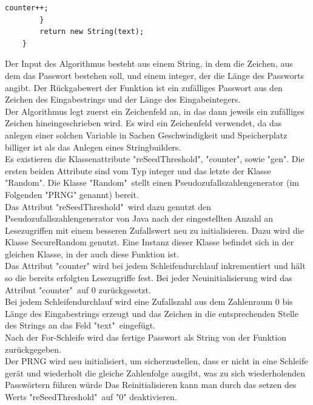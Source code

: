 \documentclass[11pt]{article}
\begin{document}
\begin{samepage}
\begin{lstlisting}[caption=Algorithmus zur Passwortgenerierung, label=lst:makePassword_1]
            counter++;
        }
        return new String(text);
    }
  \end{lstlisting}
Der Input des Algorithmus besteht aus einem String, in dem die Zeichen, aus dem das Passwort bestehen soll,
und einem integer, der die Länge des Passworts angibt. Der Rückgabewert der Funktion ist ein zufälliges Passwort aus den Zeichen des Eingabestrings und der Länge des Eingabeintegers.\\
Der Algorithmus legt zuerst ein Zeichenfeld an, in das dann jeweils ein zufälliges Zeichen hineingeschrieben wird. 
Es wird ein Zeichenfeld verwendet, da das anlegen einer solchen Variable in Sachen Geschwindigkeit und Speicherplatz  billiger ist als das Anlegen eines Stringbuilders.
\\
Es existieren die Klassenattribute "reSeedThreshold", "counter", sowie "gen". Die ersten beiden Attribute sind vom Typ integer und das letzte der Klasse "Random". Die Klasse "Random"\ stellt einen Pseudozufallszahlengenerator (im Folgenden "PRNG" genannt) bereit.
\\
Das Attribut "reSeedThreshold"\ wird dazu genutzt den Pseudozufallszahlengenerator von Java nach der eingestellten Anzahl an Lesezugriffen mit einem besseren Zufallswert neu zu initialisieren. Dazu wird die Klasse
SecureRandom genutzt. Eine Instanz dieser Klasse befindet sich in der gleichen Klasse, in der auch diese Funktion ist. 
\\
Das Attribut "counter" wird bei jedem Schleifendurchlauf inkrementiert und hält so die bereits erfolgten Lesezugriffe fest. Bei jeder Neuinitialisierung wird das Attribut "counter"\ auf 0 zurückgesetzt. 
\\
Bei jedem Schleifendurchlauf wird eine Zufallszahl aus dem Zahlenraum 0 bis Länge des Eingabestrings erzeugt und das Zeichen in die entsprechenden Stelle des Strings an das Feld "text"\ eingefügt.
\\
Nach der For-Schleife wird das fertige Passwort als String von der Funktion zurückgegeben.
\\
Der PRNG wird neu initialisiert, um sicherzustellen, dass er nicht in eine Schleife gerät und wiederholt die gleiche Zahlenfolge ausgibt, was zu sich wiederholenden Passwörtern führen würde
Das Reinitialisieren kann man durch das setzen des Werts "reSeedThreshold"\ auf "0" deaktivieren.
\end{samepage}
\end{document}

